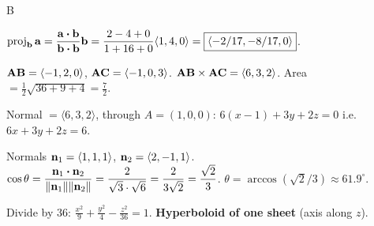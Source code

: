 \documentclass[11pt]{article}
\begin{document}
\begin{answers}{B}
\item $\operatorname{proj}_{\mathbf{b}} \mathbf{a} = \dfrac{\mathbf{a} \boldsymbol\cdot \mathbf{b}}{\mathbf{b} \boldsymbol\cdot \mathbf{b}} \mathbf{b} = \dfrac{2 - 4 + 0}{1 + 16 + 0}\langle 1,4,0 \rangle = \boxed{\langle -2/17, -8/17, 0 \rangle}$.
\item $\mathbf{AB} = \langle -1, 2, 0\rangle$, $\mathbf{AC} = \langle -1, 0, 3 \rangle$. $\mathbf{AB}\times\mathbf{AC} = \langle 6, 3, 2 \rangle$. Area $= \tfrac{1}{2}\sqrt{36 + 9 + 4} = \boxed{\tfrac{7}{2}}$.
\item Normal $= \langle 6, 3, 2 \rangle$, through $A=(1,0,0)$: $\boxed{6(x-1) + 3y + 2z = 0}$ i.e.\ $6x + 3y + 2z = 6$.
\item Normals $\mathbf{n}_1 = \langle 1,1,1\rangle$, $\mathbf{n}_2 = \langle 2,-1,1\rangle$. $\cos\theta = \dfrac{\mathbf{n}_1 \boldsymbol\cdot \mathbf{n}_2}{\|\mathbf{n}_1\|\|\mathbf{n}_2\|} = \dfrac{2}{\sqrt 3 \cdot \sqrt 6} = \dfrac{2}{3\sqrt 2} = \dfrac{\sqrt 2}{3}$. $\theta = \arccos(\sqrt 2/3) \approx \boxed{61.9^\circ}$.
\item Divide by $36$: $\tfrac{x^2}{9} + \tfrac{y^2}{4} - \tfrac{z^2}{36} = 1$. \textbf{Hyperboloid of one sheet} (axis along $z$).
\end{answers}
\end{document}
